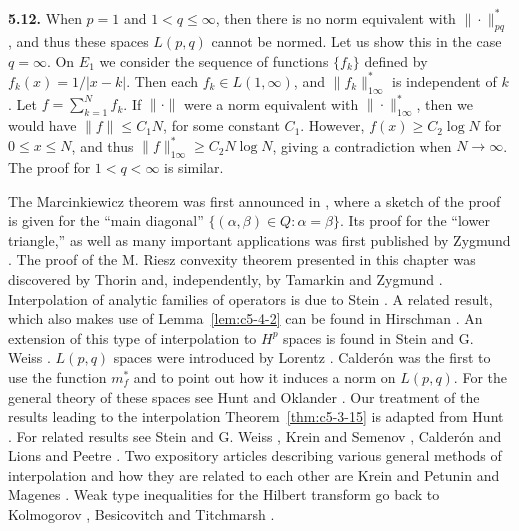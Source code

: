 \textbf{5.12.} When $p = 1$ and $1 < q \leq \infty$, then there is no norm
equivalent with $\|\cdot\|_{pq}^{*}$, and thus these spaces $L(p, q)$ cannot be
normed. Let us show this in the case $q = \infty$. On $E_{1}$ we consider the
sequence of functions $\{f_{k}\}$ defined by $f_{k}(x) = 1/|x - k|$. Then each
$f_{k} \in L(1, \infty)$, and $\|f_{k}\|_{1\infty}^{*}$ is independent of $k$.
Let $f = \sum_{k=1}^{N}f_{k}$. If $\|\cdot\|$ were a norm equivalent with
$\|\cdot\|_{1\infty}^{*}$, then we would have $\|f\| \leq C_{1}N$, for some
constant $C_{1}$. However, $f(x) \geq C_{2}\log N$ for $0 \leq x \leq N$, and
thus $\|f\|_{1\infty}^{*} \geq C_{2}N\log N$, giving a contradiction when
$N \to \infty$. The proof for $1 < q < \infty$ is similar.

\bibnoteshead

The Marcinkiewicz theorem was first announced in \cite{Marcinkiewicz2}, where
a sketch of the proof is given for the ``main diagonal''
$\{(\alpha, \beta) \in Q : \alpha = \beta\}$. Its proof for the ``lower
triangle,'' as well as many important applications was first published by
Zygmund \cite{Zygmund2}. The proof of the M. Riesz convexity theorem presented
in this chapter was discovered by Thorin \cite{Thorin1} and, independently, by
Tamarkin and Zygmund \cite{TamarkinZygmund1}. Interpolation of analytic
families of operators is due to Stein \cite{Stein2}. A related result, which
also makes use of Lemma~\ref{lem:c5-4-2} can be found in Hirschman
\cite{Hirschman1}. An extension of this type of interpolation to $H^{p}$ spaces
is found in Stein and G. Weiss \cite{SteinWeiss3}. $L(p, q)$ spaces were
introduced by Lorentz \cite{Lorentz1}. Calder\'on was the first to use the
function $m_{f}^{*}$ and to point out how it induces a norm on $L(p, q)$. For
the general theory of these spaces see Hunt \cite{Hunt1} and Oklander
\cite{Oklander1}. Our treatment of the results leading to the interpolation
Theorem~\ref{thm:c5-3-15} is adapted from Hunt \cite{Hunt1}. For related
results see Stein and G. Weiss \cite{SteinWeiss2}, Krein and Semenov
\cite{KreinSemenov1}, Calder\'on \cite{Calderon2} and Lions and Peetre
\cite{LionsPeetre1}. Two expository articles describing various general methods
of interpolation and how they are related to each other are Krein and Petunin
\cite{KreinPetunin1} and Magenes \cite{Magenes1}. Weak type inequalities for
the Hilbert transform go back to Kolmogorov \cite{Kolmogorov1}, Besicovitch
\cite{Besicovitch1} and Titchmarsh \cite{Titchmarsh1}.
